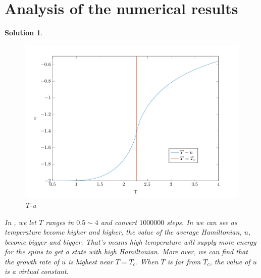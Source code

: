 \documentclass[11pt,openany]{book}              %
\newtheorem{solution}{Solution}
\begin{document}
\section{Analysis of the numerical results}
\begin{solution}
  \begin{figure}
    \centering
    \includegraphics[width=\linewidth]{figs/Tu.pdf}
    \caption{T-u}\label{fig:Tu}
  \end{figure}
  In , we let \(T\) ranges in \(0.5\sim 4\) and convert \(1000000\) steps.
  In  we can see as temperature become higher and higher, the value of the average Hamiltonian, \(u\), become bigger and bigger.
  That's means high temperature will supply more energy for the spins to get a state with high Hamiltonian.
  More over, we can find that the growth rate of \(u\) is highest near \(T=T_c\).
  When \(T\) is far from \(T_c\), the value of \(u\) is a virtual constant.


\end{solution}
\end{document}
